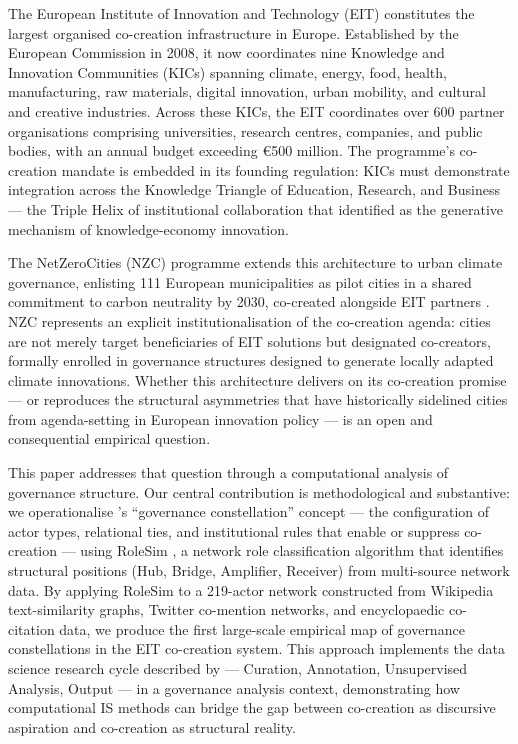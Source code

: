 \documentclass[review,12pt]{elsarticle}
\newcommand{\citepos}[1]{\citeauthor{#1}'s \citeyearpar{#1}}
\begin{document}
The European Institute of Innovation and Technology (EIT) constitutes the largest organised co-creation infrastructure in Europe. Established by the European Commission in 2008, it now coordinates nine Knowledge and Innovation Communities (KICs) spanning climate, energy, food, health, manufacturing, raw materials, digital innovation, urban mobility, and cultural and creative industries. Across these KICs, the EIT coordinates over 600 partner organisations comprising universities, research centres, companies, and public bodies, with an annual budget exceeding €500 million. The programme's co-creation mandate is embedded in its founding regulation: KICs must demonstrate integration across the Knowledge Triangle of Education, Research, and Business --- the Triple Helix of institutional collaboration that \citet{etzkowitz2000dynamics} identified as the generative mechanism of knowledge-economy innovation.

The NetZeroCities (NZC) programme extends this architecture to urban climate governance, enlisting 111 European municipalities as pilot cities in a shared commitment to carbon neutrality by 2030, co-created alongside EIT partners \citep{nzc2022pilot}. NZC represents an explicit institutionalisation of the co-creation agenda: cities are not merely target beneficiaries of EIT solutions but designated co-creators, formally enrolled in governance structures designed to generate locally adapted climate innovations. Whether this architecture delivers on its co-creation promise --- or reproduces the structural asymmetries that have historically sidelined cities from agenda-setting in European innovation policy --- is an open and consequential empirical question.

This paper addresses that question through a computational analysis of governance structure. Our central contribution is methodological and substantive: we operationalise \citepos{ansell2021co} ``governance constellation'' concept --- the configuration of actor types, relational ties, and institutional rules that enable or suppress co-creation --- using RoleSim \citep{owoyele2024rolesim}, a network role classification algorithm that identifies structural positions (Hub, Bridge, Amplifier, Receiver) from multi-source network data. By applying RoleSim to a 219-actor network constructed from Wikipedia text-similarity graphs, Twitter co-mention networks, and encyclopaedic co-citation data, we produce the first large-scale empirical map of governance constellations in the EIT co-creation system. This approach implements the data science research cycle described by \citet{maass2018data} --- Curation, Annotation, Unsupervised Analysis, Output --- in a governance analysis context, demonstrating how computational IS methods can bridge the gap between co-creation as discursive aspiration and co-creation as structural reality.
\end{document}

